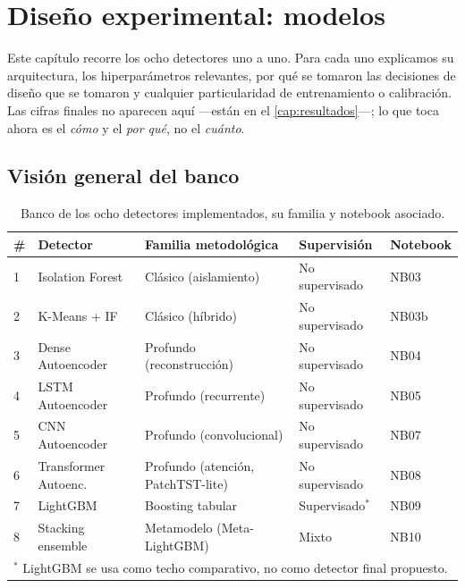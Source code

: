 \chapter{Diseño experimental: modelos}
\label{cap:diseno}

Este capítulo recorre los ocho detectores uno a uno. Para cada uno explicamos su arquitectura, los hiperparámetros relevantes, por qué se tomaron las decisiones de diseño que se tomaron y cualquier particularidad de entrenamiento o calibración. Las cifras finales no aparecen aquí ---están en el \cref{cap:resultados}---; lo que toca ahora es el \emph{cómo} y el \emph{por qué}, no el \emph{cuánto}.

\section{Visión general del banco}
\label{sec:vision-general}

\begin{table}[H]
\centering
\caption{Banco de los ocho detectores implementados, su familia y notebook asociado.}
\label{tab:bank-overview}
\small
\begin{tabularx}{\textwidth}{l l X l l}
\toprule
\# & Detector & Familia metodológica & Supervisión & Notebook \\
\midrule
1 & Isolation Forest      & Clásico (aislamiento)              & No supervisado     & NB03  \\
2 & K-Means + IF          & Clásico (híbrido)                  & No supervisado     & NB03b \\
3 & Dense Autoencoder     & Profundo (reconstrucción)          & No supervisado     & NB04  \\
4 & LSTM Autoencoder      & Profundo (recurrente)              & No supervisado     & NB05  \\
5 & CNN Autoencoder       & Profundo (convolucional)           & No supervisado     & NB07  \\
6 & Transformer Autoenc.  & Profundo (atención, PatchTST-lite) & No supervisado     & NB08  \\
7 & LightGBM              & Boosting tabular                   & Supervisado$^*$    & NB09  \\
8 & Stacking ensemble     & Metamodelo (Meta-LightGBM)         & Mixto              & NB10  \\
\bottomrule
\multicolumn{5}{l}{\footnotesize $^*$ LightGBM se usa como techo comparativo, no como detector final propuesto.}
\end{tabularx}
\end{table}

